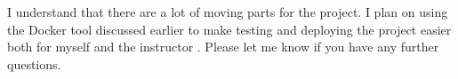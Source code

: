 \documentclass[letterpaper,11pt]{../templates/texMemo}
\begin{document}
    I understand that there are a lot of moving parts for the project. I plan on using the Docker tool discussed earlier to make testing and deploying the project easier both for myself and the instructor \parencite{docker_website_2022}. Please let me know if you have any further questions.

    \newpage

    \printbibliography
\end{document}
